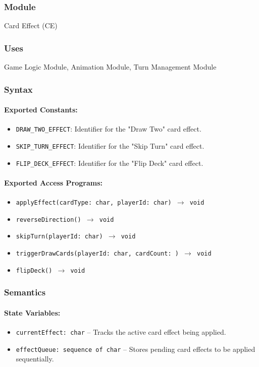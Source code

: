 \documentclass[12pt, titlepage]{article}
\begin{document}
\subsubsection{Module}
Card Effect (CE)

\subsubsection{Uses}
Game Logic Module, Animation Module, Turn Management Module

\subsubsection{Syntax}

\paragraph{Exported Constants:}
\begin{itemize}
    \item \texttt{DRAW\_TWO\_EFFECT}: Identifier for the "Draw Two" card effect.
    \item \texttt{SKIP\_TURN\_EFFECT}: Identifier for the "Skip Turn" card effect.
    \item \texttt{FLIP\_DECK\_EFFECT}: Identifier for the "Flip Deck" card effect.
\end{itemize}

\paragraph{Exported Access Programs:}
\begin{itemize}
    \item \texttt{applyEffect(cardType: char, playerId: char) $\to$ void}
    \item \texttt{reverseDirection() $\to$ void}
    \item \texttt{skipTurn(playerId: char) $\to$ void}
    \item \texttt{triggerDrawCards(playerId: char, cardCount: ) $\to$ void}
    \item \texttt{flipDeck() $\to$ void}
\end{itemize}

\subsubsection{Semantics}

\paragraph{State Variables:}
\begin{itemize}
    \item \texttt{currentEffect: char} -- Tracks the active card effect being applied.
    \item \texttt{effectQueue: sequence of char} -- Stores pending card effects to be applied sequentially.
\end{itemize}
\end{document}
